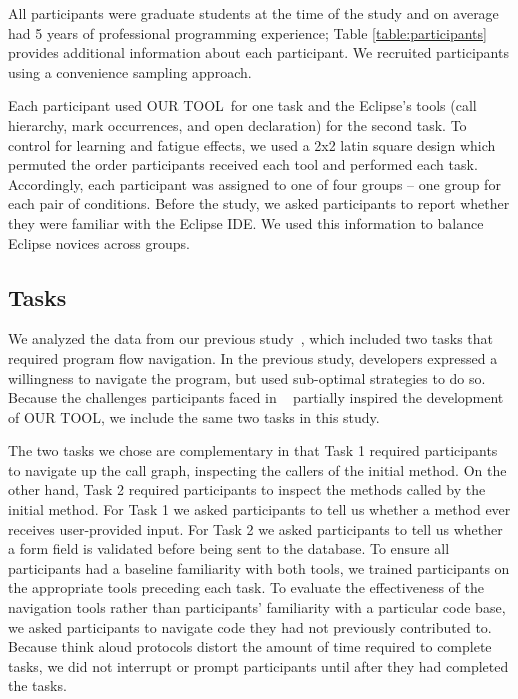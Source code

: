 \documentclass[conference]{IEEEtran}
\newcommand{\toolName}{OUR TOOL}
\begin{document}
All participants were graduate students at the time of the study and on average had 5 years of professional programming experience; Table \ref{table:participants} provides additional information about each participant. We recruited participants using a convenience sampling approach. 

Each participant used \toolName~for one task and the Eclipse's tools (call hierarchy, mark occurrences, and open declaration) for the second task.
To control for learning and fatigue effects, we used a 2x2 latin square design which permuted the order participants received each tool and performed each task. Accordingly, each participant was assigned to one of four groups -- one group for each pair of conditions.
Before the study, we asked participants to report whether they were familiar with the Eclipse IDE. We used this information to balance Eclipse novices across groups.


\subsection{Tasks}
We analyzed the data from our previous study~\cite{Smith2015}, which included two tasks that required program flow navigation.
In the previous study, developers expressed a willingness to navigate the program, but used sub-optimal strategies to do so.
Because the challenges participants faced in ~\cite{Smith2015} partially inspired the development of \toolName, we include the same two tasks in this study.

The two tasks we chose are complementary in that Task 1 required participants to navigate up the call graph, inspecting the callers of the initial method. 
On the other hand, Task 2 required participants to inspect the methods called by the initial method.
For Task 1 we asked participants to tell us whether a method ever receives user-provided input.
For Task 2 we asked participants to tell us whether a form field is validated before being sent to the database.
To ensure all participants had a baseline familiarity with both tools, we trained participants on the appropriate tools preceding each task. 
To evaluate the effectiveness of the navigation tools rather than participants' familiarity with a particular code base, we asked participants to navigate code they had not previously contributed to. 
Because think aloud protocols distort the amount of time required to complete tasks, we did not interrupt or prompt participants until after they had completed the tasks.

\end{document}
